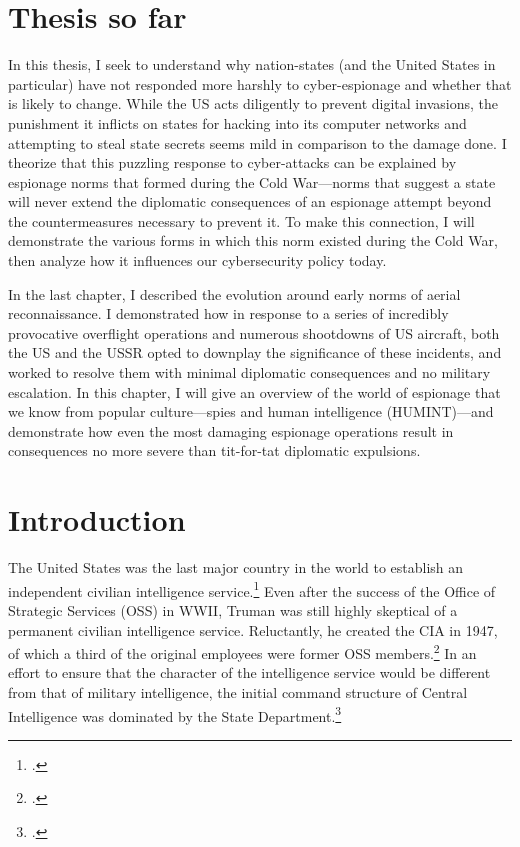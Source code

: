\documentclass{report}
\begin{document}
\begin{refsegment}

\section*{Thesis so far}
\begin{em}
In this thesis, I seek to understand why nation-states (and the United States in particular) have not responded more harshly to cyber-espionage and whether that is likely to change. While the US acts diligently to prevent digital invasions, the punishment it inflicts on states for hacking into its computer networks and attempting to steal state secrets seems mild in comparison to the damage done. I theorize that this puzzling response to cyber-attacks can be explained by espionage norms that formed during the Cold War---norms that suggest a state will never extend the diplomatic consequences of an espionage attempt beyond the countermeasures necessary to prevent it. To make this connection, I will demonstrate the various forms in which this norm existed during the Cold War, then analyze how it influences our cybersecurity policy today.

In the last chapter, I described the evolution around early norms of aerial reconnaissance. I demonstrated how in response to a series of incredibly provocative overflight operations and numerous shootdowns of US aircraft, both the US and the USSR opted to downplay the significance of these incidents, and worked to resolve them with minimal diplomatic consequences and no military escalation. In this chapter, I will give an overview of the world of espionage that we know from popular culture---spies and human intelligence (HUMINT)---and demonstrate how even the most damaging espionage operations result in consequences no more severe than tit-for-tat diplomatic expulsions.
\end{em}

\section{Introduction}
The United States was the last major country in the world to establish an independent civilian intelligence service.\footcite[p.~35]{olson_fair_2006} Even after the success of the Office of Strategic Services (OSS) in WWII, Truman was still highly skeptical of a permanent civilian intelligence service. Reluctantly, he created the CIA in 1947, of which a third of the original employees were former OSS members.\footcite[p.~37]{olson_fair_2006} In an effort to ensure that the character of the intelligence service would be different from that of military intelligence, the initial command structure of Central Intelligence was dominated by the State Department.\footcite{troy_truman_1993}


\end{refsegment}
\end{document}
